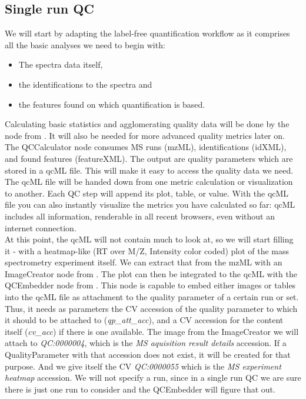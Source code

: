 \subsection{Single run QC}
\label{Single run QC}

We will start by adapting the label-free quantification workflow as it comprises all the basic analyses we need to begin with:

\begin{itemize}
\item The spectra data itself,
\item the identifications to the spectra and
\item the features found on which quantification is based.
\end{itemize}

Calculating basic statistics and agglomerating quality data will be done by the  node from . It will also be needed for  more advanced quality metrics later on. The QCCalculator node consumes MS runs (mzML), identifications (idXML), and found features (featureXML). The output are quality parameters which are stored in a qcML file. This will make it easy to access the quality data we need.\\
The qcML file will be handed down from one metric calculation or visualization to another. Each QC step will append its plot, table, or value. With the qcML file you can also instantly visualize the metrics you have calculated so far: qcML includes all information, renderable in all recent browsers, even without an internet connection. \\
At this point, the qcML will not contain much to look at, so we will start filling it - with a heatmap-like (RT over M/Z, Intensity color coded) plot of the mass spectrometry experiment itself. We can extract that from the mzML with an ImageCreator node from . The plot can then be integrated to the qcML with the QCEmbedder node from . This node is capable to embed either images or tables into the qcML file as attachment to the quality parameter of a certain run or set. Thus, it needs as parameters the CV accession  of the quality parameter to which it should to be attached to (\textit{qp\_att\_acc}), and a CV accession for the content itself (\textit{cv\_acc}) if there is one available. The image from the ImageCreator we will attach to \textit{QC:0000004}, which is the \textit{MS aquisition result details} accession. If a QualityParameter with that accession does not exist, it will be created for that purpose. And we give itself the CV \textit{QC:0000055} which is the \textit{MS experiment heatmap} accession. We will not specify a run, since in a single run QC we are sure there is just one run to consider and the QCEmbedder will figure that out.\\

